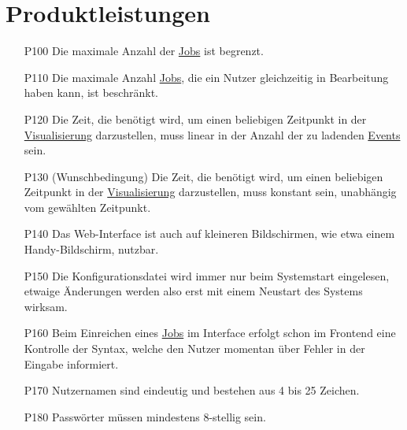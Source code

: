 \section{Produktleistungen}

%

\begin{itemize}[noitemsep]
    \item[P100] Die maximale Anzahl der \hyperref[B:Jobs]{Jobs} ist begrenzt.
    
    \item[P110] Die maximale Anzahl \hyperref[B:Jobs]{Jobs}, die ein \gls{Nutzer} gleichzeitig in Bearbeitung haben kann, ist beschränkt.
    
    \item[P120] Die Zeit, die benötigt wird, um einen beliebigen Zeitpunkt in der \hyperref[pages:visualization]{Visualisierung} darzustellen, muss linear in der Anzahl der zu ladenden \hyperref[B:Event]{Events} sein.
    
    \item[P130] (Wunschbedingung)  Die Zeit, die benötigt wird, um einen beliebigen Zeitpunkt in der \hyperref[pages:visualization]{Visualisierung} darzustellen, muss konstant sein, unabhängig vom gewählten Zeitpunkt.
    
    \item[P140] Das \gls{Web-Interface} ist auch auf kleineren Bildschirmen, wie etwa einem Handy-Bildschirm, nutzbar.
    
    \item[P150] Die \gls{Konfigurationsdatei} wird immer nur beim Systemstart eingelesen, etwaige Änderungen werden also erst mit einem Neustart des Systems wirksam.
    
    \item[P160] Beim Einreichen eines \hyperref[B:Jobs]{Jobs} im Interface erfolgt schon im Frontend eine Kontrolle der Syntax, welche den \gls{Nutzer} momentan über Fehler in der Eingabe informiert.
    
    \item[P170] Nutzernamen sind eindeutig und bestehen aus 4 bis 25 Zeichen.

    \item[P180] Passwörter müssen mindestens 8-stellig sein.
    

\end{itemize}
